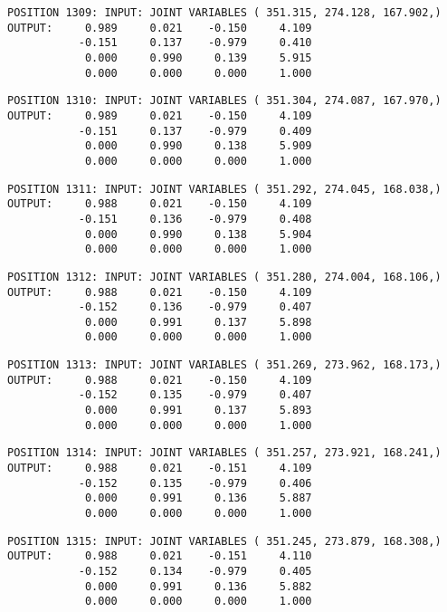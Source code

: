 \begin{verbatim}
POSITION 1309: INPUT: JOINT VARIABLES ( 351.315, 274.128, 167.902,)
OUTPUT:     0.989     0.021    -0.150     4.109
           -0.151     0.137    -0.979     0.410
            0.000     0.990     0.139     5.915
            0.000     0.000     0.000     1.000
\end{verbatim} \pagebreak[1]\begin{verbatim}
POSITION 1310: INPUT: JOINT VARIABLES ( 351.304, 274.087, 167.970,)
OUTPUT:     0.989     0.021    -0.150     4.109
           -0.151     0.137    -0.979     0.409
            0.000     0.990     0.138     5.909
            0.000     0.000     0.000     1.000
\end{verbatim} \pagebreak[1]\begin{verbatim}
POSITION 1311: INPUT: JOINT VARIABLES ( 351.292, 274.045, 168.038,)
OUTPUT:     0.988     0.021    -0.150     4.109
           -0.151     0.136    -0.979     0.408
            0.000     0.990     0.138     5.904
            0.000     0.000     0.000     1.000
\end{verbatim} \pagebreak[1]\begin{verbatim}
POSITION 1312: INPUT: JOINT VARIABLES ( 351.280, 274.004, 168.106,)
OUTPUT:     0.988     0.021    -0.150     4.109
           -0.152     0.136    -0.979     0.407
            0.000     0.991     0.137     5.898
            0.000     0.000     0.000     1.000
\end{verbatim} \pagebreak[1]\begin{verbatim}
POSITION 1313: INPUT: JOINT VARIABLES ( 351.269, 273.962, 168.173,)
OUTPUT:     0.988     0.021    -0.150     4.109
           -0.152     0.135    -0.979     0.407
            0.000     0.991     0.137     5.893
            0.000     0.000     0.000     1.000
\end{verbatim} \pagebreak[1]\begin{verbatim}
POSITION 1314: INPUT: JOINT VARIABLES ( 351.257, 273.921, 168.241,)
OUTPUT:     0.988     0.021    -0.151     4.109
           -0.152     0.135    -0.979     0.406
            0.000     0.991     0.136     5.887
            0.000     0.000     0.000     1.000
\end{verbatim} \pagebreak[1]\begin{verbatim}
POSITION 1315: INPUT: JOINT VARIABLES ( 351.245, 273.879, 168.308,)
OUTPUT:     0.988     0.021    -0.151     4.110
           -0.152     0.134    -0.979     0.405
            0.000     0.991     0.136     5.882
            0.000     0.000     0.000     1.000
\end{verbatim} \pagebreak[1]\begin{verbatim}

\end{verbatim}
